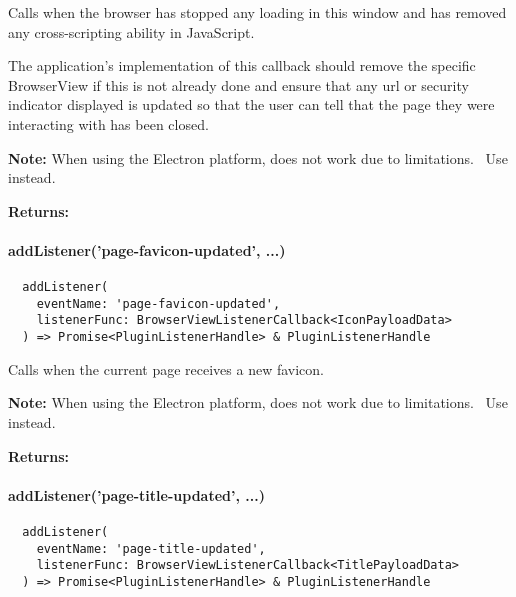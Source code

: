 Calls  when the browser has stopped any loading in this window
and has removed any cross-scripting ability in JavaScript.

The application's implementation of this callback should remove the specific BrowserView if this is not already done
and ensure that any \ac{url} or security indicator displayed is updated so that the user can tell that the page they were
interacting with has been closed.

\textbf{Note:} When using the Electron platform,  does not work due to limitations.~\cite{capacitor-electron}
Use  instead.

\textbf{Returns:} 


\newpage

\paragraph{addListener('page-favicon-updated', ...)}

\begin{verbatim}
  addListener(
    eventName: 'page-favicon-updated',
    listenerFunc: BrowserViewListenerCallback<IconPayloadData>
  ) => Promise<PluginListenerHandle> & PluginListenerHandle
\end{verbatim}

Calls  when the current page receives a new favicon.

\textbf{Note:} When using the Electron platform,  does not work due to limitations.~\cite{capacitor-electron}
Use  instead.

\textbf{Returns:} 



\paragraph{addListener('page-title-updated', ...)}

\begin{verbatim}
  addListener(
    eventName: 'page-title-updated',
    listenerFunc: BrowserViewListenerCallback<TitlePayloadData>
  ) => Promise<PluginListenerHandle> & PluginListenerHandle
\end{verbatim}

